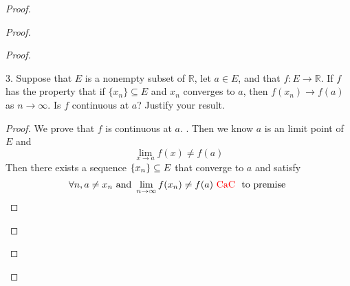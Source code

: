 \documentclass{report}
\begin{document}
\begin{proof}
\begin{proof}
\begin{proof}
\begin{question}{}{}
3. Suppose that \(E\) is a nonempty subset of \(\mathbb{R}\), let \(a \in E\), and that \(f : E \rightarrow \mathbb{R}\). If \(f\) has
the property that if \(\{x_n\} \subseteq E\) and \(x_n\) converges to \(a\), then \(f(x_n) \rightarrow f(a)\) as \(n \rightarrow \infty\). Is \(f\)
continuous at \(a\)? Justify your result.
\end{question}
\begin{proof}
We prove that $f$ is continuous at $a$. . Then we know $a$ is an limit point of $E$ and 
 \begin{equation*}
\lim_{x\to a}f(x)\neq f(a)
\end{equation*}
Then there exists a sequence $\{ x_n \}\subseteq E$ that converge to $a$ and satisfy
 \begin{equation*}
\forall n,a\neq x_n\text{ and }\lim_{n\to\infty}f(x_n)\neq f(a)\text{ \textcolor{red}{CaC} }\text{ to premise }
\end{equation*}
\end{proof}


\end{proof}
\end{proof}
\end{proof}
\end{document}
